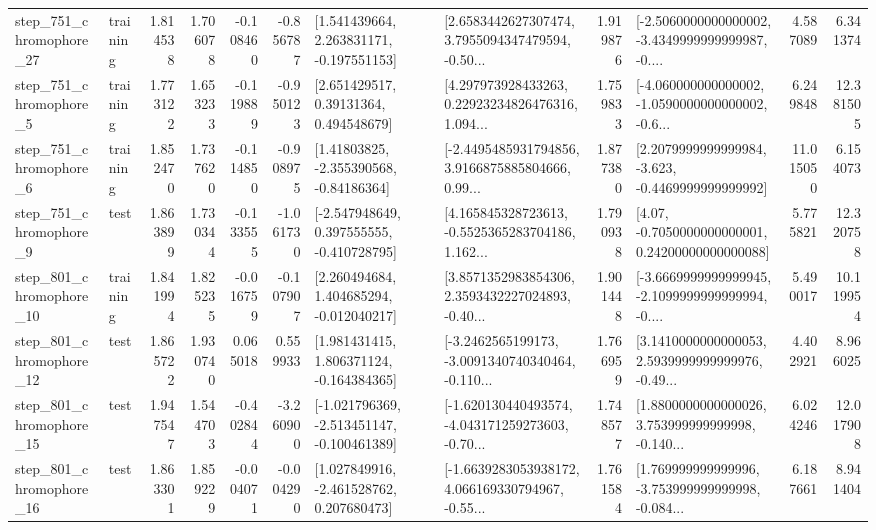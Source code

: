 \begin{tabular}{llrrrrllrlrr}
  step\_751\_chromophore\_27 &  training &      1.814538 &    1.706078 &     -0.108460 & -0.856787 &    [1.541439664, 2.263831171, -0.197551153] &  [2.6583442627307474, 3.7955094347479594, -0.50... &       1.919876 &  [-2.5060000000000002, -3.4349999999999987, -0.... &            4.587089 &          6.341374 \\
   step\_751\_chromophore\_5 &  training &      1.773122 &    1.653233 &     -0.119889 & -0.950123 &      [2.651429517, 0.39131364, 0.494548679] &  [4.297973928433263, 0.22923234826476316, 1.094... &       1.759833 &  [-4.060000000000002, -1.0590000000000002, -0.6... &            6.249848 &         12.381505 \\
   step\_751\_chromophore\_6 &  training &      1.852470 &    1.737620 &     -0.114850 & -0.908975 &     [1.41803825, -2.355390568, -0.84186364] &  [-2.4495485931794856, 3.9166875885804666, 0.99... &       1.877380 &  [2.2079999999999984, -3.623, -0.4469999999999992] &           11.015050 &          6.154073 \\
   step\_751\_chromophore\_9 &      test &      1.863899 &    1.730344 &     -0.133555 & -1.061730 &   [-2.547948649, 0.397555555, -0.410728795] &  [4.165845328723613, -0.5525365283704186, 1.162... &       1.790938 &   [4.07, -0.7050000000000001, 0.24200000000000088] &            5.775821 &         12.320758 \\
  step\_801\_chromophore\_10 &  training &      1.841994 &    1.825235 &     -0.016759 & -0.107907 &    [2.260494684, 1.404685294, -0.012040217] &  [3.8571352983854306, 2.3593432227024893, -0.40... &       1.901448 &  [-3.6669999999999945, -2.1099999999999994, -0.... &            5.490017 &         10.119954 \\
  step\_801\_chromophore\_12 &      test &      1.865722 &    1.930740 &      0.065018 &  0.559933 &    [1.981431415, 1.806371124, -0.164384365] &  [-3.2462565199173, -3.0091340740340464, -0.110... &       1.766959 &  [3.1410000000000053, 2.5939999999999976, -0.49... &            4.402921 &          8.966025 \\
  step\_801\_chromophore\_15 &      test &      1.947547 &    1.544703 &     -0.402844 & -3.260900 &  [-1.021796369, -2.513451147, -0.100461389] &  [-1.620130440493574, -4.043171259273603, -0.70... &       1.748577 &  [1.8800000000000026, 3.753999999999998, -0.140... &            6.024246 &         12.017908 \\
  step\_801\_chromophore\_16 &      test &      1.863301 &    1.859229 &     -0.004071 & -0.004290 &    [1.027849916, -2.461528762, 0.207680473] &  [-1.6639283053938172, 4.066169330794967, -0.55... &       1.761584 &  [1.769999999999996, -3.753999999999998, -0.084... &            6.187661 &          8.941404 \\

\end{tabular}
